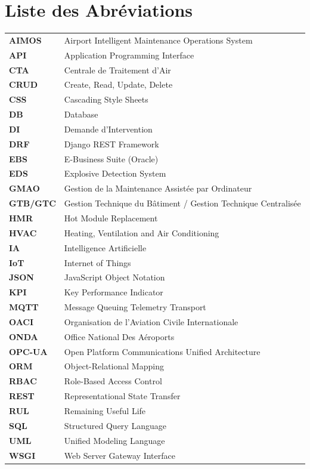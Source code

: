 \chapter*{Liste des Abréviations}

\begin{tabular}{@{}ll@{}}
\textbf{AIMOS} & Airport Intelligent Maintenance Operations System \\
\textbf{API} & Application Programming Interface \\
\textbf{CTA} & Centrale de Traitement d'Air \\
\textbf{CRUD} & Create, Read, Update, Delete \\
\textbf{CSS} & Cascading Style Sheets \\
\textbf{DB} & Database \\
\textbf{DI} & Demande d'Intervention \\
\textbf{DRF} & Django REST Framework \\
\textbf{EBS} & E-Business Suite (Oracle) \\
\textbf{EDS} & Explosive Detection System \\
\textbf{GMAO} & Gestion de la Maintenance Assistée par Ordinateur \\
\textbf{GTB/GTC} & Gestion Technique du Bâtiment / Gestion Technique Centralisée \\
\textbf{HMR} & Hot Module Replacement \\
\textbf{HVAC} & Heating, Ventilation and Air Conditioning \\
\textbf{IA} & Intelligence Artificielle \\
\textbf{IoT} & Internet of Things \\
\textbf{JSON} & JavaScript Object Notation \\
\textbf{KPI} & Key Performance Indicator \\
\textbf{MQTT} & Message Queuing Telemetry Transport \\
\textbf{OACI} & Organisation de l'Aviation Civile Internationale \\
\textbf{ONDA} & Office National Des Aéroports \\
\textbf{OPC-UA} & Open Platform Communications Unified Architecture \\
\textbf{ORM} & Object-Relational Mapping \\
\textbf{RBAC} & Role-Based Access Control \\
\textbf{REST} & Representational State Transfer \\
\textbf{RUL} & Remaining Useful Life \\
\textbf{SQL} & Structured Query Language \\
\textbf{UML} & Unified Modeling Language \\
\textbf{WSGI} & Web Server Gateway Interface \\
\end{tabular}

